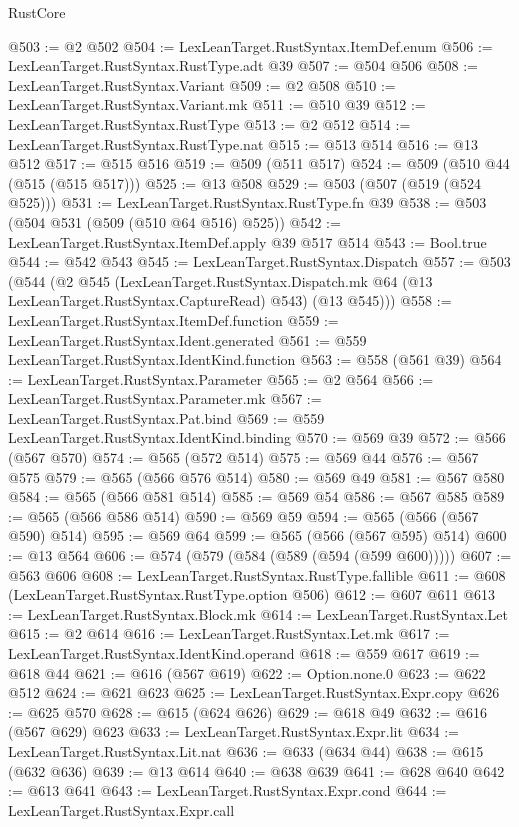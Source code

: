 \begin{lexlean}{RustCore}
\begin{coremodule}
@503 := @2 @502
@504 := LexLeanTarget.RustSyntax.ItemDef.enum
@506 := LexLeanTarget.RustSyntax.RustType.adt @39
@507 := @504 @506
@508 := LexLeanTarget.RustSyntax.Variant
@509 := @2 @508
@510 := LexLeanTarget.RustSyntax.Variant.mk
@511 := @510 @39
@512 := LexLeanTarget.RustSyntax.RustType
@513 := @2 @512
@514 := LexLeanTarget.RustSyntax.RustType.nat
@515 := @513 @514
@516 := @13 @512
@517 := @515 @516
@519 := @509 (@511 @517)
@524 := @509 (@510 @44 (@515 (@515 @517)))
@525 := @13 @508
@529 := @503 (@507 (@519 (@524 @525)))
@531 := LexLeanTarget.RustSyntax.RustType.fn @39
@538 := @503 (@504 @531 (@509 (@510 @64 @516) @525))
@542 := LexLeanTarget.RustSyntax.ItemDef.apply @39 @517 @514
@543 := Bool.true
@544 := @542 @543
@545 := LexLeanTarget.RustSyntax.Dispatch
@557 := @503
    (@544
      (@2
        @545
        (LexLeanTarget.RustSyntax.Dispatch.mk @64 (@13 LexLeanTarget.RustSyntax.CaptureRead) @543)
        (@13 @545)))
@558 := LexLeanTarget.RustSyntax.ItemDef.function
@559 := LexLeanTarget.RustSyntax.Ident.generated
@561 := @559 LexLeanTarget.RustSyntax.IdentKind.function
@563 := @558 (@561 @39)
@564 := LexLeanTarget.RustSyntax.Parameter
@565 := @2 @564
@566 := LexLeanTarget.RustSyntax.Parameter.mk
@567 := LexLeanTarget.RustSyntax.Pat.bind
@569 := @559 LexLeanTarget.RustSyntax.IdentKind.binding
@570 := @569 @39
@572 := @566 (@567 @570)
@574 := @565 (@572 @514)
@575 := @569 @44
@576 := @567 @575
@579 := @565 (@566 @576 @514)
@580 := @569 @49
@581 := @567 @580
@584 := @565 (@566 @581 @514)
@585 := @569 @54
@586 := @567 @585
@589 := @565 (@566 @586 @514)
@590 := @569 @59
@594 := @565 (@566 (@567 @590) @514)
@595 := @569 @64
@599 := @565 (@566 (@567 @595) @514)
@600 := @13 @564
@606 := @574 (@579 (@584 (@589 (@594 (@599 @600)))))
@607 := @563 @606
@608 := LexLeanTarget.RustSyntax.RustType.fallible
@611 := @608 (LexLeanTarget.RustSyntax.RustType.option @506)
@612 := @607 @611
@613 := LexLeanTarget.RustSyntax.Block.mk
@614 := LexLeanTarget.RustSyntax.Let
@615 := @2 @614
@616 := LexLeanTarget.RustSyntax.Let.mk
@617 := LexLeanTarget.RustSyntax.IdentKind.operand
@618 := @559 @617
@619 := @618 @44
@621 := @616 (@567 @619)
@622 := Option.none.{0}
@623 := @622 @512
@624 := @621 @623
@625 := LexLeanTarget.RustSyntax.Expr.copy
@626 := @625 @570
@628 := @615 (@624 @626)
@629 := @618 @49
@632 := @616 (@567 @629) @623
@633 := LexLeanTarget.RustSyntax.Expr.lit
@634 := LexLeanTarget.RustSyntax.Lit.nat
@636 := @633 (@634 @44)
@638 := @615 (@632 @636)
@639 := @13 @614
@640 := @638 @639
@641 := @628 @640
@642 := @613 @641
@643 := LexLeanTarget.RustSyntax.Expr.cond
@644 := LexLeanTarget.RustSyntax.Expr.call

\end{coremodule}
\end{lexlean}
